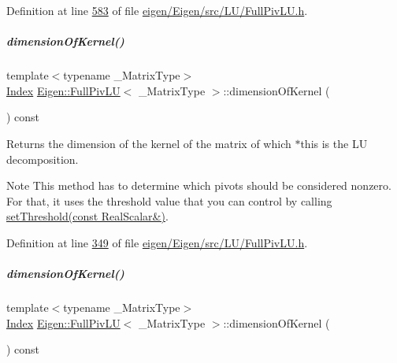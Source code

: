 Definition at line \hyperlink{eigen_2_eigen_2src_2_l_u_2_full_piv_l_u_8h_source_l00583}{583} of file \hyperlink{eigen_2_eigen_2src_2_l_u_2_full_piv_l_u_8h_source}{eigen/\+Eigen/src/\+L\+U/\+Full\+Piv\+L\+U.\+h}.

\mbox{\label{group___l_u___module_a64e191225834e91161ea53ad4b78167b}} 
\subparagraph{\texorpdfstring{dimension\+Of\+Kernel()}{dimensionOfKernel()}\hspace{0.1cm}{\footnotesize\ttfamily [1/2]}}
{\footnotesize\ttfamily template$<$typename \+\_\+\+Matrix\+Type$>$ \\
\hyperlink{group___core___module_a554f30542cc2316add4b1ea0a492ff02}{Index} \hyperlink{group___l_u___module_class_eigen_1_1_full_piv_l_u}{Eigen\+::\+Full\+Piv\+LU}$<$ \+\_\+\+Matrix\+Type $>$\+::dimension\+Of\+Kernel (\begin{DoxyParamCaption}{ }\end{DoxyParamCaption}) const\hspace{0.3cm}{\ttfamily [inline]}}

\begin{DoxyReturn}{Returns}
the dimension of the kernel of the matrix of which $\ast$this is the LU decomposition.
\end{DoxyReturn}
\begin{DoxyNote}{Note}
This method has to determine which pivots should be considered nonzero. For that, it uses the threshold value that you can control by calling \hyperlink{group___l_u___module_a414592d82de98f5bd075965caf56d681}{set\+Threshold(const Real\+Scalar\&)}. 
\end{DoxyNote}


Definition at line \hyperlink{eigen_2_eigen_2src_2_l_u_2_full_piv_l_u_8h_source_l00349}{349} of file \hyperlink{eigen_2_eigen_2src_2_l_u_2_full_piv_l_u_8h_source}{eigen/\+Eigen/src/\+L\+U/\+Full\+Piv\+L\+U.\+h}.

\mbox{\label{group___l_u___module_a64e191225834e91161ea53ad4b78167b}} 
\subparagraph{\texorpdfstring{dimension\+Of\+Kernel()}{dimensionOfKernel()}\hspace{0.1cm}{\footnotesize\ttfamily [2/2]}}
{\footnotesize\ttfamily template$<$typename \+\_\+\+Matrix\+Type$>$ \\
\hyperlink{group___core___module_a554f30542cc2316add4b1ea0a492ff02}{Index} \hyperlink{group___l_u___module_class_eigen_1_1_full_piv_l_u}{Eigen\+::\+Full\+Piv\+LU}$<$ \+\_\+\+Matrix\+Type $>$\+::dimension\+Of\+Kernel (\begin{DoxyParamCaption}{ }\end{DoxyParamCaption}) const\hspace{0.3cm}{\ttfamily [inline]}}

